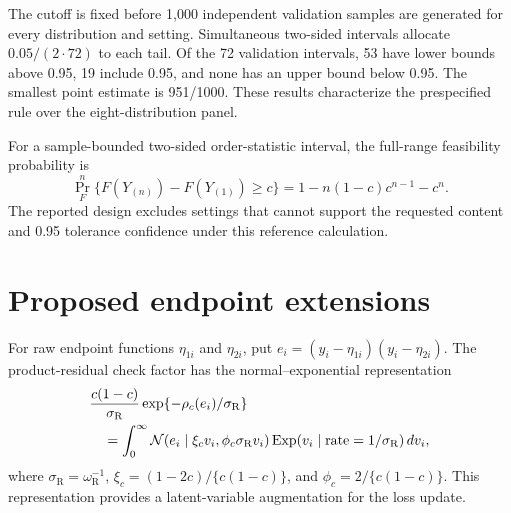 The cutoff is fixed before 1,000 independent validation samples are generated
for every distribution and setting. Simultaneous two-sided intervals allocate
\(0.05/(2\cdot72)\) to each tail. Of the 72 validation intervals, 53 have
lower bounds above 0.95, 19 include 0.95, and none has an upper bound below
0.95. The smallest point estimate is 951/1000. These results characterize the
prespecified rule over the eight-distribution panel.



\begin{table}[!htbp]
\centering
\caption[Independent-sample tolerance validation]{\textbf{Independent-sample tolerance validation.} Results are shown by
sample-size/content setting and method. Each row summarizes the range
across eight simulation distributions at tolerance confidence \(0.95\). All three
reported methods produced an interval in every replication in this run.}
\label{rqr2026:tab:tolerance-validation-primary}
\TableStyle

\end{table}

For a sample-bounded two-sided order-statistic interval, the full-range
feasibility probability is
\[
\Pr_F^n\{F(Y_{(n)})-F(Y_{(1)})\ge c\}
=1-n(1-c)c^{n-1}-c^n.
\]
The reported design excludes settings that cannot support the requested content
and 0.95 tolerance confidence under this reference calculation.

\section{Proposed endpoint extensions}
\label{app:mti-extensions}

For raw endpoint functions \(\eta_{1i}\) and \(\eta_{2i}\), put
\(e_i=(y_i-\eta_{1i})(y_i-\eta_{2i})\). The product-residual check factor has
the normal--exponential representation
\begin{align*}
&\frac{c(1-c)}{\sigma_{\mathrm R}}
\exp\{-\rho_c(e_i)/\sigma_{\mathrm R}\}\\
&\quad=\int_0^\infty
\mathcal{N}(e_i\mid\xi_cv_i,\phi_c\sigma_{\mathrm R}v_i)
\operatorname{Exp}(v_i\mid\mathrm{rate}=1/\sigma_{\mathrm R})\,dv_i,
\end{align*}
where \(\sigma_{\mathrm R}=\omega_{\mathrm R}^{-1}\),
\(\xi_c=(1-2c)/\{c(1-c)\}\), and
\(\phi_c=2/\{c(1-c)\}\). This representation provides a latent-variable
augmentation for the loss update.

